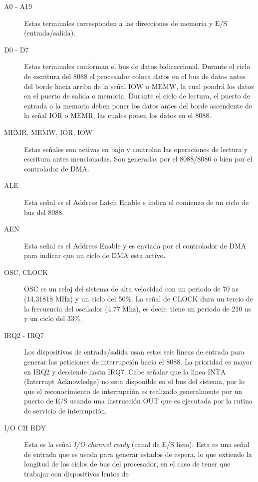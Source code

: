 \begin{description}
\item[A0 - A19] Es\-tas terminales corresponden a las di\-rec\-cio\-nes de me\-mo\-ria y E/S %
(en\-tra\-da/sa\-li\-da).
\item[D0 - D7] Estas terminales conforman el bus de datos bidireccional. Durante el ciclo de %
escritura del 8088 el procesador coloca datos en el bus de datos antes del borde hacia arriba de %
la se\~nal $\overline{\mbox{IOW}}$ o $\overline{\mbox{MEMW}}$, la cual pondr\'a los %
datos en el puerto de salida o memoria. Durante el ciclo de lectura, el puerto de entrada o la %
memoria deben poner los datos antes del borde ascendente de la se\~nal %
$\overline{\mbox{IOR}}$ o $\overline{\mbox{MEMR}}$, las cuales ponen los datos en el %
8088.
\item[$\overline{\mbox{MEMR}}$, $\overline{\mbox{MEMW}}$, %
$\overline{\mbox{IOR}}$, $\overline{\mbox{IOW}}$] Estas se\~nales son activas en bajo %
y controlan las operaciones de lectura y escritura antes mencionadas. Son generadas por el %
8088/8086 o bien por el controlador de DMA.
\item[ALE] Esta se\~nal es el Address Latch Enable e indica el comienzo de un ciclo de bus del %
8088. 
\item[AEN] Esta se\~nal es el Address Enable y es enviada por el controlador de DMA para %
indicar que un ciclo de DMA esta activo. 
\item[OSC, CLOCK] OSC es un reloj del sistema de alta velocidad con un periodo de 70 ns %
(14.31818 MHz) y un ciclo del 50\%. La se\~nal de CLOCK dura un tercio de la frecuencia del %
oscilador (4.77 Mhz), es decir, tiene un periodo de 210 ns y un ciclo del 33\%.
\item[IRQ2 - IRQ7] Los dispositivos de entrada/salida usan estas seis l\'{\i}neas de entrada %
para generar las peticiones de interrupci\'on hacia el 8088. La prioridad es mayor en IRQ2 y %
desciende hasta IRQ7. Cabe se\~nalar que la l\'{\i}nea $\overline{\mbox{INTA}}$ %
(Interrupt Acknowledge) no esta disponible en el bus del sistema, por lo que el reconocimiento %
de interrupci\'on es realizado generalmente por un puerto de E/S usando una instrucci\'on OUT %
que es ejecutada por la rutina de servicio de interrupci\'on.
\item[I/O CH RDY] Esta es la se\~nal {\it I/O channel ready\/} (canal de E/S listo). Esta es %
una se\~nal de entrada que es usada para generar estados de espera, lo que extiende la longitud %
de los ciclos de bus del procesador, en el caso de tener que trabajar con dispositivos lentos de %

\end{description}
